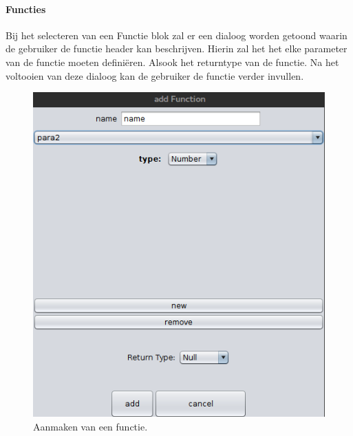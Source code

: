 \documentclass[]{article}
\begin{document}
\paragraph{Functies}
Bij het selecteren van een Functie blok zal er een dialoog worden getoond waarin de gebruiker de functie header kan beschrijven. Hierin zal het het elke parameter van de functie moeten defini\"{e}ren. Alsook het returntype van de functie. Na het voltooien van deze dialoog kan de gebruiker de functie verder invullen.
\begin{figure}[H]
  \centering
\includegraphics[scale=0.4]{Documentatie/images/functiondialog}
  \caption{Aanmaken van een functie.} 
\end{figure}
\end{document}
